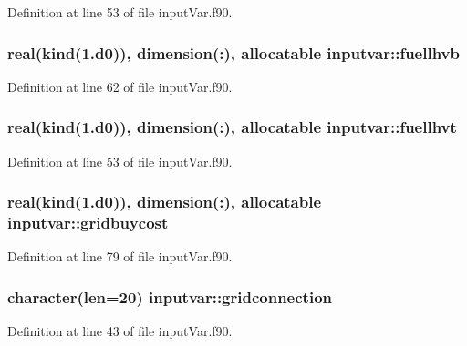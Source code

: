 Definition at line 53 of file input\-Var.\-f90.

\hypertarget{classinputvar_a433ed9c0483e649c0c6e1be84bc9ece2}{
\subsubsection[{fuellhvb}]{\setlength{\rightskip}{0pt plus 5cm}real(kind(1.d0)), dimension(\-:), allocatable inputvar\-::fuellhvb}}\label{classinputvar_a433ed9c0483e649c0c6e1be84bc9ece2}


Definition at line 62 of file input\-Var.\-f90.

\hypertarget{classinputvar_a0fafd66a5d231ffafe01ff620004eb65}{
\subsubsection[{fuellhvt}]{\setlength{\rightskip}{0pt plus 5cm}real(kind(1.d0)), dimension(\-:), allocatable inputvar\-::fuellhvt}}\label{classinputvar_a0fafd66a5d231ffafe01ff620004eb65}


Definition at line 53 of file input\-Var.\-f90.

\hypertarget{classinputvar_a7c31f58cc66e43cd8e7caddeda7ad097}{
\subsubsection[{gridbuycost}]{\setlength{\rightskip}{0pt plus 5cm}real(kind(1.d0)), dimension(\-:), allocatable inputvar\-::gridbuycost}}\label{classinputvar_a7c31f58cc66e43cd8e7caddeda7ad097}


Definition at line 79 of file input\-Var.\-f90.

\hypertarget{classinputvar_a8488f705094b7c59cf8cb06939fe9a7a}{
\subsubsection[{gridconnection}]{\setlength{\rightskip}{0pt plus 5cm}character(len=20) inputvar\-::gridconnection}}\label{classinputvar_a8488f705094b7c59cf8cb06939fe9a7a}


Definition at line 43 of file input\-Var.\-f90.

